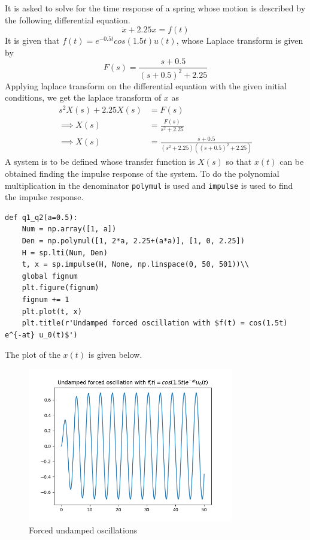 \documentclass[12pt, a4paper]{article}
\begin{document}
It is asked to solve for the time response of a spring whose motion is described by the following differential equation.
\begin{equation*}
\ddot{x} + 2.25x = f(t)
\end{equation*}
It is given that $f(t) = e^{-0.5t}cos(1.5t)u(t)$, whose Laplace transform is given by
\begin{equation*}
F(s) = \frac{s+0.5}{(s+0.5)^2 + 2.25}
\end{equation*}
Applying laplace transform on the differential equation with the given initial conditions, we get the laplace transform of $x$ as
\begin{align*}
s^2 X(s) + 2.25X(s) &= F(s) \\
\implies X(s) &= \frac{F(s)}{s^2 + 2.25} \\
\implies X(s) &= \frac{s + 0.5}{(s^2 + 2.25)((s+0.5)^2 + 2.25)}
\end{align*}
A system is to be defined whose transfer function is $X(s)$ so that $x(t)$ can be obtained finding the impulse response of the system. To do the polynomial multiplication in the denominator \texttt{polymul} is used and \texttt{impulse} is used to find the impulse response.
\begin{lstlisting}
def q1_q2(a=0.5):
    Num = np.array([1, a])
    Den = np.polymul([1, 2*a, 2.25+(a*a)], [1, 0, 2.25])
    H = sp.lti(Num, Den)
    t, x = sp.impulse(H, None, np.linspace(0, 50, 501))\\
    global fignum
    plt.figure(fignum)
    fignum += 1
    plt.plot(t, x)
    plt.title(r'Undamped forced oscillation with $f(t) = cos(1.5t) e^{-at} u_0(t)$')
\end{lstlisting}
The plot of the $x(t)$ is given below.
\begin{figure}[H]
\centering
\includegraphics[width=0.8\textwidth]{Figure_1.png}
\caption{Forced undamped oscillations}
\end{figure}
\end{document}
